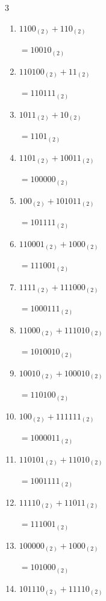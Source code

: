 \begin{multicols}{3}
\begin{enumerate}
        $=10011_{(2)}$

  \item $1100_{(2)} + 110_{(2)}$

        $=10010_{(2)}$

  \item $110100_{(2)} + 11_{(2)}$

        $=110111_{(2)}$

\columnbreak %

\resetques

  \item $1011_{(2)} + 10_{(2)}$

        $=1101_{(2)}$

  \item $1101_{(2)} + 10011_{(2)}$

        $=100000_{(2)}$

  \item $100_{(2)} + 101011_{(2)}$

        $=101111_{(2)}$

  \item $110001_{(2)} + 1000_{(2)}$

        $=111001_{(2)}$

  \item $1111_{(2)} + 111000_{(2)}$

        $=1000111_{(2)}$

  \item $11000_{(2)} + 111010_{(2)}$

        $=1010010_{(2)}$

  \item $10010_{(2)} + 100010_{(2)}$

        $=110100_{(2)}$

  \item $100_{(2)} + 111111_{(2)}$

        $=1000011_{(2)}$

  \item $110101_{(2)} + 11010_{(2)}$

        $=1001111_{(2)}$

  \item $11110_{(2)} + 11011_{(2)}$

        $=111001_{(2)}$

\columnbreak %

  \item $100000_{(2)} + 1000_{(2)}$

        $=101000_{(2)}$

  \item $101110_{(2)} + 11110_{(2)}$


\end{enumerate}
\end{multicols}
